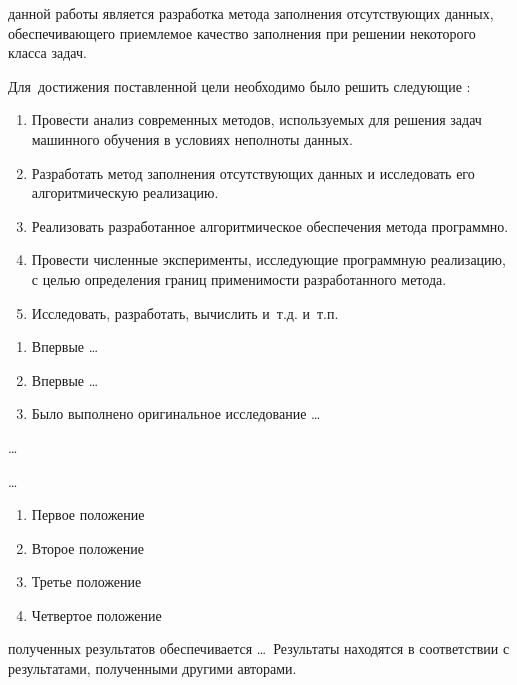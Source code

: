 
{\aim} данной работы является разработка метода заполнения
отсутствующих данных, обеспечивающего приемлемое качество заполнения
при решении некоторого класса задач.

Для~достижения поставленной цели необходимо было решить следующие {\tasks}:
\begin{enumerate}
  \item Провести анализ современных методов, используемых для решения
    задач машинного обучения в условиях неполноты данных.
  \item Разработать метод заполнения отсутствующих данных и исследовать
    его алгоритмическую реализацию.
  \item Реализовать разработанное алгоритмическое обеспечения метода
    программно.
  \item Провести численные эксперименты, исследующие программную
    реализацию, с целью определения границ применимости разработанного
    метода.
  \item Исследовать, разработать, вычислить и~т.\:д. и~т.\:п.
\end{enumerate}


{\novelty}
\begin{enumerate}
  \item Впервые \ldots
  \item Впервые \ldots
  \item Было выполнено оригинальное исследование \ldots
\end{enumerate}

{\influence} \ldots

{\methods} \ldots

{}
\begin{enumerate}
  \item Первое положение
  \item Второе положение
  \item Третье положение
  \item Четвертое положение
\end{enumerate}

{\reliability} полученных результатов обеспечивается \ldots \ Результаты находятся в соответствии с результатами, полученными другими авторами.


